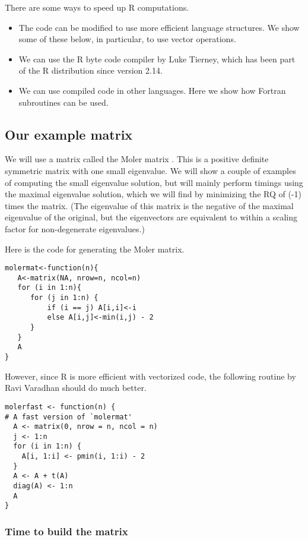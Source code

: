 There are some ways to speed up R computations.

\begin{itemize}
\tightlist
\item
  The code can be modified to use more efficient language structures. We
  show some of these below, in particular, to use vector operations.
\item
  We can use the R byte code compiler by Luke Tierney, which has been
  part of the R distribution since version 2.14.
\item
  We can use compiled code in other languages. Here we show how Fortran
  subroutines can be used.
\end{itemize}

\subsection{Our example matrix}\label{our-example-matrix}

We will use a matrix called the Moler matrix \cite[Appendix 1]{cnm79}.
This is a positive definite
symmetric matrix with one small eigenvalue. We will show a couple of
examples of computing the small eigenvalue solution, but will mainly
perform timings using the maximal eigenvalue solution, which we will
find by minimizing the RQ of (-1) times the matrix. (The eigenvalue
of this matrix is the negative of the maximal eigenvalue of the
original, but the eigenvectors are equivalent to within a scaling
factor for non-degenerate eigenvalues.)

Here is the code for generating the Moler matrix.

\begin{verbatim}
molermat<-function(n){
   A<-matrix(NA, nrow=n, ncol=n)
   for (i in 1:n){
      for (j in 1:n) {
          if (i == j) A[i,i]<-i
          else A[i,j]<-min(i,j) - 2
      }
   }
   A
}
\end{verbatim}

However, since R is more efficient with vectorized code, the following routine by
Ravi Varadhan should do much better.

\begin{verbatim}
molerfast <- function(n) {
# A fast version of `molermat'
  A <- matrix(0, nrow = n, ncol = n)
  j <- 1:n
  for (i in 1:n) {
    A[i, 1:i] <- pmin(i, 1:i) - 2
  }
  A <- A + t(A)
  diag(A) <- 1:n
  A
}
\end{verbatim}

\subsubsection{Time to build the matrix}\label{time-to-build-the-matrix}

